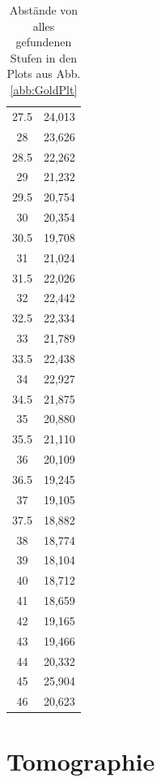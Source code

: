 \begin{table}[h]
\begin{center}
\begin{tabular}[central]{ c | c }
27.5	&	24,013	\\
28	&	23,626	\\
28.5	&	22,262	\\
29	&	21,232	\\
29.5	&	20,754	\\
30	&	20,354	\\
30.5	&	19,708	\\
31	&	21,024	\\
31.5	&	22,026	\\
32	&	22,442	\\
32.5	&	22,334	\\
33	&	21,789	\\
33.5	&	22,438	\\
34	&	22,927	\\
34.5	&	21,875	\\
35	&	20,880	\\
35.5	&	21,110	\\
36	&	20,109	\\
36.5	&	19,245	\\
37	&	19,105	\\
37.5	&	18,882	\\
38	&	18,774	\\
39	&	18,104	\\
40	&	18,712	\\
41	&	18,659	\\
42	&	19,165	\\
43	&	19,466	\\
44	&	20,332	\\
45	&	25,904	\\
46	&	20,623	\\
\end{tabular}
\caption{Abstände von alles gefundenen Stufen in den Plots aus Abb. \ref{abb:GoldPlt}}
\label{tab:Wenner}
\end{center}
\end{table}


\section{Tomographie}

